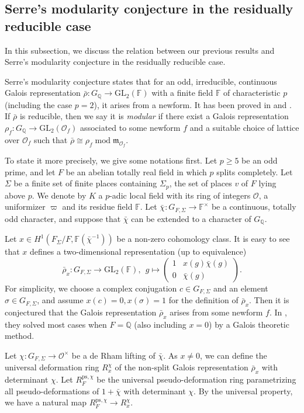 \documentclass[a4paper, 12pt]{amsart}
\DeclareMathOperator{\modd}{mod}
\def\ps{\mathrm{ps}}
\newcommand{\F}{\mathbb{F}}
\newcommand{\Q}{\mathbb{Q}}
\newcommand{\GL}{\mathrm{GL}}
\newcommand{\cO}{\mathcal{O}}
\begin{document}
    \subsection{Serre's modularity conjecture in the residually reducible case}  In this subsection, we discuss the relation between our previous results and Serre's modularity conjecture in the residually reducible case.
    
    Serre's modularity conjecture states that for an odd, irreducible, continuous Galois representation $\bar{\rho}: G_{\Q} \to \GL_2(\F)$ with a finite field $\F$ of characteristic $p$ (including the case $p=2$), it arises from a newform. It has been proved in \cite{Khare_2009a} and \cite{Khare_2009}. If $\bar{\rho}$ is reducible, then we say it is \textit{modular} if there exist a Galois representation $\rho_{f}: G_{\Q} \to \GL_2(\cO_f)$ associated to some newform $f$ and a suitable choice of lattice over $\cO_f$ such that $\bar{\rho} \cong \rho_{f} \modd \mathfrak{m}_{\cO_f}$.
    
    To state it more precisely, we give some notations first. Let $p \ge 5$ be an odd prime, and let $F$ be an abelian totally real field in which $p$ splits completely. Let $\Sigma$ be a finite set of finite places containing $\Sigma_p$, the set of places $v$ of $F$ lying above $p$. We denote by $K$  a $p$-adic local field with its ring of integers $\cO$, a uniformizer $\varpi$ and its residue field $\F$. Let $\bar{\chi}: G_{F, \Sigma} \to \F^\times$ be a continuous, totally odd character, and suppose that $\bar{\chi} $ can be extended to a character of $G_{\Q}$.
    
    Let $x \in H^1(F_\Sigma/F, \F(\bar{\chi}^{-1}))$ be a non-zero cohomology class. It is easy to see that $x$ defines a two-dimensional representation (up to equivalence)
    $$ \bar{\rho}_x : G_{F, \Sigma} \to \GL_2(\F), ~~ g \mapsto \begin{pmatrix}
    	1 & x(g)\bar{\chi}(g)\\
    	0& \bar{\chi}(g)
    \end{pmatrix}. $$
    For simplicity, we choose a complex conjugation $c \in G_{F, \Sigma}$ and an element $\sigma \in G_{F, \Sigma}$, and assume $x(c)=0, x(\sigma)=1$ for the definition of $ \bar{\rho}_x$. Then it is conjectured that the Galois representation $ \bar{\rho}_x$ arises from some newform $f$. In \cite{Fakhruddin2022}, they solved most cases when $F=\Q$ (also including $x=0$) by a Galois theoretic method. 
    
     Let $\chi : G_{F, \Sigma} \to \cO^\times$ be a de Rham lifting of $\bar{\chi}$. As $x \ne 0$, we can define the universal deformation ring $R_x^{\chi}$ of the non-split Galois representation $ \bar{\rho}_x$ with determinant $\chi$. Let $ R_{F}^{\ps, \chi}$ be the universal pseudo-deformation ring parametrizing all pseudo-deformations of $1+\bar{\chi}$ with determinant $\chi$. By the universal property, we have a natural map $R_{F}^{\ps, \chi} \to R_x^{\chi} $.
     
\end{document}
